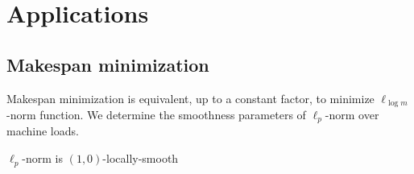 
\section{Applications}

\subsection{Makespan minimization}

Makespan minimization is equivalent, up to a constant factor, to minimize $\ell_{\log m}$-norm function. 
We determine the smoothness parameters of $\ell_{p}$-norm over machine loads. 

\begin{lemma}
$\ell_{p}$-norm is $(1,0)$-locally-smooth
\end{lemma}
%
